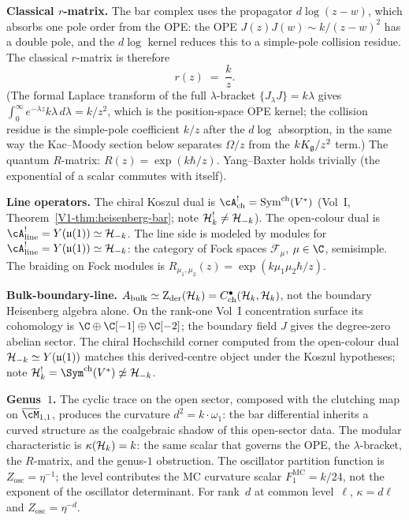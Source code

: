 \smallskip
\noindent\textbf{Classical $r$-matrix.}\enspace
The bar complex uses the propagator $d\log(z-w)$, which absorbs one pole order from the OPE: the OPE $J(z)J(w)\sim k/(z-w)^2$ has a double pole, and the $d\log$ kernel reduces this to a simple-pole collision residue. The classical $r$-matrix is therefore
\[
r(z) \;=\; \frac{k}{z}.
\]
(The formal Laplace transform of the full $\lambda$-bracket $\{J_\lambda J\}=k\lambda$ gives $\int_0^\infty e^{-\lambda z}k\lambda\,d\lambda = k/z^2$, which is the position-space OPE kernel; the collision residue is the simple-pole coefficient $k/z$ after the $d\log$ absorption, in the same way the Kac--Moody section below separates $\Omega/z$ from the $kK_{\mathfrak{g}}/z^2$ term.)
The quantum $R$-matrix: $R(z) = \exp(k\hbar/z)$. Yang--Baxter
holds trivially (the exponential of a scalar commutes with itself).

\smallskip
\noindent\textbf{Line operators.}\enspace
The chiral Koszul dual is
$\cA^!_{\mathrm{ch}} = \mathrm{Sym}^{\mathrm{ch}}(V^*)$
(Vol~I, Theorem~\ref*{V1-thm:heisenberg-bar}; note
$\mathcal{H}_k^!\neq\mathcal{H}_{-k}$). The open-colour dual is
$\cA^!_{\mathrm{line}} = Y(\mathfrak{u}(1)) \simeq \cH_{-k}$.
The line side is modeled by modules for
$\cA^!_{\mathrm{line}} = Y(\mathfrak{u}(1)) \simeq \cH_{-k}$:
the category of Fock spaces $\mathcal{F}_\mu$, $\mu \in \C$,
semisimple. The braiding on Fock modules is
$R_{\mu_1,\mu_2}(z) = \exp(k\mu_1\mu_2\hbar/z)$.

\smallskip
\noindent\textbf{Bulk-boundary-line.}\enspace
$A_{\mathrm{bulk}} \simeq \operatorname{Z}_{\mathrm{der}}(\mathcal{H}_k)=C^\bullet_{\mathrm{ch}}(\mathcal{H}_k,\mathcal{H}_k)$,
not the boundary Heisenberg algebra alone.  On the rank-one Vol~I
concentration surface its cohomology is
$\C\oplus\C[-1]\oplus\C[-2]$; the boundary field $J$ gives the
degree-zero abelian sector.  The chiral Hochschild corner computed
from the open-colour dual
$\mathcal{H}_{-k} \simeq Y(\mathfrak{u}(1))$ matches this derived-centre
object under the Koszul hypotheses; note
$\cH_k^! = \Sym^{\mathrm{ch}}(V^*) \not\simeq \cH_{-k}$.

\smallskip
\noindent\textbf{Genus~$1$.}\enspace
The cyclic trace on the open sector, composed with the
clutching map on $\overline{\cM}_{1,1}$, produces the
curvature $d^2 = k \cdot \omega_1$: the bar differential
inherits a curved structure as the coalgebraic shadow of
this open-sector data. The modular characteristic is
$\kappa(\mathcal{H}_k) = k$: the same scalar that governs the OPE, the
$\lambda$-bracket, the $R$-matrix, and the genus-$1$ obstruction.
The oscillator partition function is $Z_{\mathrm{osc}}=\eta^{-1}$;
the level contributes the MC curvature scalar
$F_1^{\mathrm{MC}}=k/24$, not the exponent of the oscillator
determinant.  For rank~$d$ at common level~$\ell$,
$\kappa=d\ell$ and $Z_{\mathrm{osc}}=\eta^{-d}$.


